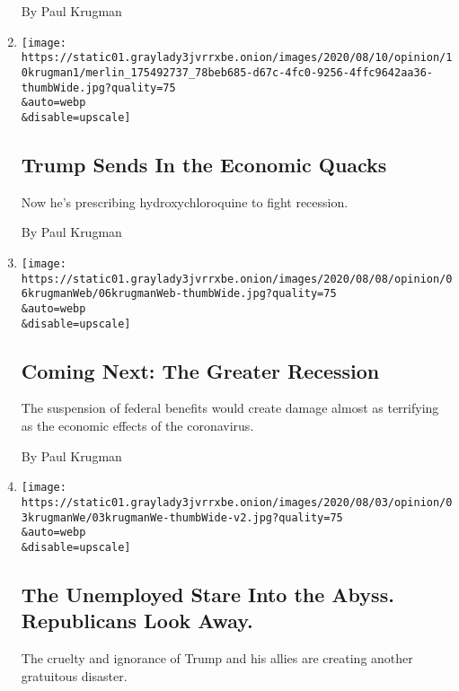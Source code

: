\begin{enumerate}
  By Paul Krugman
\item
  \href{/2020/08/10/opinion/trump-coronavirus-social-security.html}{}

  \texttt{[image: https://static01.graylady3jvrrxbe.onion/images/2020/08/10/opinion/10krugman1/merlin\_175492737\_78beb685-d67c-4fc0-9256-4ffc9642aa36-thumbWide.jpg?quality=75\\\&auto=webp\\\&disable=upscale]}

  \hypertarget{trump-sends-in-the-economic-quacks}{%
  \subsection{Trump Sends In the Economic
  Quacks}\label{trump-sends-in-the-economic-quacks}}

  Now he's prescribing hydroxychloroquine to fight recession.

  By Paul Krugman
\item
  \href{/2020/08/06/opinion/coronavirus-us-recession.html}{}

  \texttt{[image: https://static01.graylady3jvrrxbe.onion/images/2020/08/08/opinion/06krugmanWeb/06krugmanWeb-thumbWide.jpg?quality=75\\\&auto=webp\\\&disable=upscale]}

  \hypertarget{coming-next-the-greater-recession}{%
  \subsection{Coming Next: The Greater
  Recession}\label{coming-next-the-greater-recession}}

  The suspension of federal benefits would create damage almost as
  terrifying as the economic effects of the coronavirus.

  By Paul Krugman
\item
  \href{/2020/08/03/opinion/republicans-unemployed-coronavirus.html}{}

  \texttt{[image: https://static01.graylady3jvrrxbe.onion/images/2020/08/03/opinion/03krugmanWe/03krugmanWe-thumbWide-v2.jpg?quality=75\\\&auto=webp\\\&disable=upscale]}

  \hypertarget{the-unemployed-stare-into-the-abyss-republicans-look-away}{%
  \subsection{The Unemployed Stare Into the Abyss. Republicans Look
  Away.}\label{the-unemployed-stare-into-the-abyss-republicans-look-away}}

  The cruelty and ignorance of Trump and his allies are creating another
  gratuitous disaster.


\end{enumerate}
